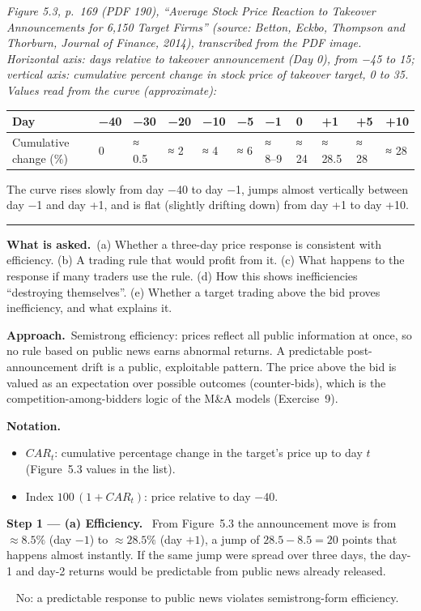 \documentclass[11pt,a4paper]{article}
\newcommand{\notation}{\par\noindent\textbf{Notation.}}
\newcommand{\step}[2]{\par\medskip\noindent\textbf{Step #1 --- #2.}~}
\newcommand{\asked}{\par\medskip\noindent\textbf{What is asked.}~}
\newcommand{\approach}{\par\smallskip\noindent\textbf{Approach.}~}
\newcommand{\answer}[1]{\par\smallskip\noindent\fbox{\textbf{Answer #1.}}~}
\newcommand{\stmtend}{\par\endgroup\nopagebreak\noindent\rule{\linewidth}{0.4pt}\par\medskip}
\begin{document}
\emph{Figure 5.3, p.~169 (PDF 190), ``Average Stock Price Reaction to Takeover Announcements for
6,150 Target Firms'' (source: Betton, Eckbo, Thompson and Thorburn, Journal of Finance, 2014),
transcribed from the PDF image. Horizontal axis: days relative to takeover announcement (Day 0),
from −45 to 15; vertical axis: cumulative percent change in stock price of takeover target, 0 to 35.
Values read from the curve (approximate):}

{\def\LTcaptype{none} %
\begin{longtable}[]{@{}lllllllllll@{}}
\toprule\noalign{}
Day & −40 & −30 & −20 & −10 & −5 & −1 & 0 & +1 & +5 & +10 \\
\midrule\noalign{}
\endhead
\bottomrule\noalign{}
\endlastfoot
Cumulative change (\%) & 0 & ≈ 0.5 & ≈ 2 & ≈ 4 & ≈ 6 & ≈ 8--9 & ≈ 24 & ≈ 28.5 & ≈ 28 & ≈ 28 \\
\end{longtable}
}

The curve rises slowly from day −40 to day −1, jumps almost vertically between day −1 and day +1,
and is flat (slightly drifting down) from day +1 to day +10.
\stmtend

\asked (a) Whether a three-day price response is consistent with efficiency. (b) A trading rule that
would profit from it. (c) What happens to the response if many traders use the rule. (d) How this
shows inefficiencies ``destroying themselves''. (e) Whether a target trading above the bid proves
inefficiency, and what explains it.

\approach Semistrong efficiency: prices reflect all public information at once, so no rule based on
public news earns abnormal returns. A predictable post-announcement drift is a public, exploitable
pattern. The price above the bid is valued as an expectation over possible outcomes (counter-bids),
which is the competition-among-bidders logic of the M\&A models (Exercise~9).

\notation
\begin{itemize}
  \item $CAR_t$: cumulative percentage change in the target's price up to day $t$ (Figure~5.3 values in the list).
  \item Index $100\,(1+CAR_t)$: price relative to day $-40$.
\end{itemize}

\step{1}{(a) Efficiency} From Figure~5.3 the announcement move is from $\approx 8.5\%$ (day $-1$) to
$\approx 28.5\%$ (day $+1$), a jump of $28.5-8.5=20$ points that happens almost instantly. If the same jump were spread
over three days, the day-1 and day-2 returns would be predictable from public news already released.
\answer{(a)} No: a predictable response to public news violates semistrong-form efficiency.
\end{document}

